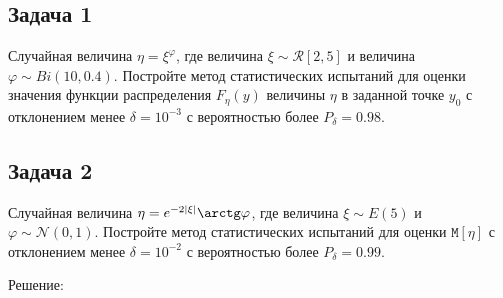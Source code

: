 \documentclass[a4paper,12pt]{article}
\newcommand{\modulus}[1]{\left | #1 \right |}
\newcommand{\expectation}[1]{\mathtt{M} \left[ #1 \right]}
\newif\ifsolutions
\begin{document}
\subsection*{Задача 1}

Случайная величина $\eta = \xi^ \varphi$, где величина $\xi \sim \mathcal{R} \left[ 2, 5 \right]$ и величина $\varphi \sim Bi(10, 0.4)$. Постройте
метод статистических испытаний для оценки значения функции распределения $F_\eta(y)$ величины $\eta$ в заданной точке $y_0$ с отклонением менее
$\delta = 10^{-3}$ с вероятностью более $P_\delta = 0.98$.

\ifsolutions
    Решение:

    $(\xi_1, \dots, \xi_n)$ --- выборка из $Bi(10, 0.4)$, $(\varphi_1, \dots, \varphi_n)$ --- выборка из $\mathcal{R} \left[ 2, 5 \right]$,
    оценка:
    \begin{gather*}
        \eta_k = \xi_k \ln \varphi_k , \\
        \varepsilon_k = \left \{
        \begin{array}{ll}
            1, \eta_k < y_0 \\
            0, \eta_k \ge y_0
        \end{array}
        \right . , \\
        F_\eta(y_0) \approx \frac{1}{n} \sum_{k=1}^n \varepsilon_k .
    \end{gather*}
    Требуемый объём выборок:
    \begin{gather*}
        n \ge \widehat{n}_\delta
        = \left( K^{-1} ( P_\delta ) \right)^2 \frac{1}{\delta^2}
        \approx 1.5174^2 \frac{1}{10^{-6}}
        \approx 2.302503 \cdot 10^6
        = 2 302 503 .
    \end{gather*}

\fi

\subsection*{Задача 2}

Случайная величина $\eta = e^{- 2 \modulus{\xi}} \arctg \varphi$, где величина $\xi \sim E(5)$ и $\varphi \sim \mathcal{N}(0,1)$. Постройте
метод статистических испытаний для оценки $\expectation{\eta}$ с отклонением менее $\delta = 10^{-2}$ с вероятностью более $P_\delta = 0.99$.

\ifsolutions
    Решение:
\end{document}

